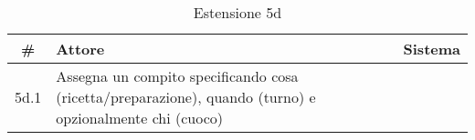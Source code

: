 \begin{table}\centering\caption*{Estensione 5d}
    \small
    \begin{tabular}{|c|p{7cm}|p{6.23cm}|}
        \hline\bfseries \# & \bfseries Attore                                                                                        & \bfseries Sistema                                 \\\hline
        5d.1               & Assegna un compito specificando cosa (ricetta/preparazione), quando (turno) e opzionalmente chi (cuoco) & \color{red}{Cuoco non disponibile nel dato turno} \\\hline
    \end{tabular}
\end{table}